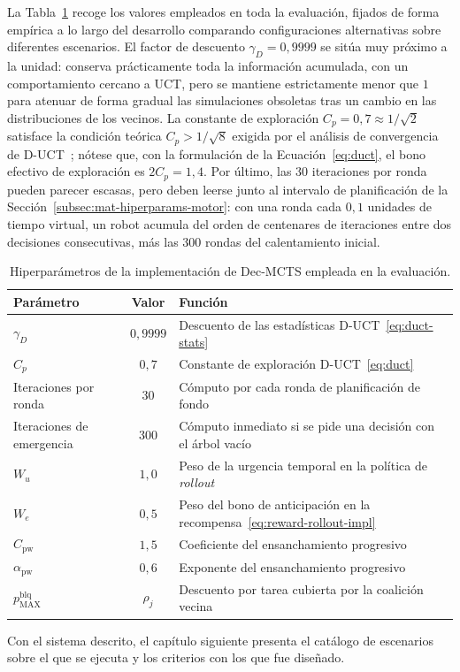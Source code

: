 La Tabla~\ref{tab:decmcts-hiper} recoge los valores empleados en toda la evaluación, fijados de forma empírica a lo largo del desarrollo comparando configuraciones alternativas sobre diferentes escenarios. El factor de descuento $\gamma_D=0{,}9999$ se sitúa muy próximo a la unidad: conserva prácticamente toda la información acumulada, con un comportamiento cercano a UCT, pero se mantiene estrictamente menor que $1$ para atenuar de forma gradual las simulaciones obsoletas tras un cambio en las distribuciones de los vecinos. La constante de exploración $C_p=0{,}7\approx1/\sqrt{2}$ satisface la condición teórica $C_p>1/\sqrt{8}$ exigida por el análisis de convergencia de D-UCT~\cite{best2019decmcts,garivier2011ducb}; nótese que, con la formulación de la Ecuación~\eqref{eq:duct}, el bono efectivo de exploración es $2C_p=1{,}4$. Por último, las $30$ iteraciones por ronda pueden parecer escasas, pero deben leerse junto al intervalo de planificación de la Sección~\ref{subsec:mat-hiperparams-motor}: con una ronda cada $0{,}1$ unidades de tiempo virtual, un robot acumula del orden de centenares de iteraciones entre dos decisiones consecutivas, más las $300$ rondas del calentamiento inicial.

\begin{table}[t]
\centering
\caption{Hiperparámetros de la implementación de Dec-MCTS empleada en la evaluación.}
\label{tab:decmcts-hiper}
\begin{tabular}{lcl}
\hline
\textbf{Parámetro} & \textbf{Valor} & \textbf{Función} \\
\hline
$\gamma_D$        & $0{,}9999$ & Descuento de las estadísticas D-UCT~\eqref{eq:duct-stats} \\
$C_p$             & $0{,}7$    & Constante de exploración D-UCT~\eqref{eq:duct} \\
Iteraciones por ronda & $30$   & Cómputo por cada ronda de planificación de fondo \\
Iteraciones de emergencia & $300$ & Cómputo inmediato si se pide una decisión con el árbol vacío \\
$W_u$             & $1{,}0$    & Peso de la urgencia temporal en la política de \textit{rollout} \\
$W_e$             & $0{,}5$    & Peso del bono de anticipación en la recompensa~\eqref{eq:reward-rollout-impl} \\
$C_{\mathrm{pw}}$ & $1{,}5$    & Coeficiente del ensanchamiento progresivo \\
$\alpha_{\mathrm{pw}}$ & $0{,}6$ & Exponente del ensanchamiento progresivo \\
$p^{\mathrm{blq}}_{\mathrm{MAX}}$ & $\rho_j$ & Descuento por tarea cubierta por la coalición vecina \\
\hline
\end{tabular}
\end{table}


Con el sistema descrito, el capítulo siguiente presenta el catálogo de escenarios sobre el que se ejecuta y los criterios con los que fue diseñado.